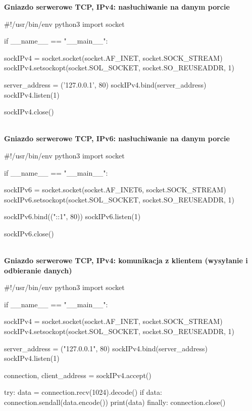 \newpage
\noindent \textbf{Gniazdo serwerowe TCP, IPv4: nasłuchiwanie na danym porcie}

\begin{code}
#!/usr/bin/env python3
import socket

if __name__ == "__main__":

	sockIPv4 = socket.socket(socket.AF_INET, socket.SOCK_STREAM)
	sockIPv4.setsockopt(socket.SOL_SOCKET, socket.SO_REUSEADDR, 1)

	server_address = ('127.0.0.1', 80)
	sockIPv4.bind(server_address)
	sockIPv4.listen(1)

	sockIPv4.close()
\end{code}\mbox{}\\


\noindent \textbf{Gniazdo serwerowe TCP, IPv6: nasłuchiwanie na danym porcie}

\begin{code}
#!/usr/bin/env python3
import socket

if __name__ == "__main__":


    sockIPv6 = socket.socket(socket.AF_INET6, socket.SOCK_STREAM)
    sockIPv6.setsockopt(socket.SOL_SOCKET, socket.SO_REUSEADDR, 1)

    sockIPv6.bind(("::1", 80))
    sockIPv6.listen(1)
    
    sockIPv6.close()
\end{code}\mbox{}\\

\newpage
\noindent \textbf{Gniazdo serwerowe TCP, IPv4: komunikacja z klientem (wysyłanie i odbieranie danych)}

\begin{code}
#!/usr/bin/env python3
import socket

if __name__ == "__main__":

    sockIPv4 = socket.socket(socket.AF_INET, socket.SOCK_STREAM)
    sockIPv4.setsockopt(socket.SOL_SOCKET, socket.SO_REUSEADDR, 1)

    server_address = ("127.0.0.1", 80)
    sockIPv4.bind(server_address)
    sockIPv4.listen(1)

    connection, client_address = sockIPv4.accept()

    try:
        data = connection.recv(1024).decode()
        if data:
            connection.sendall(data.encode())
            print(data)
    finally:
        connection.close()
\end{code}\mbox{}\\

